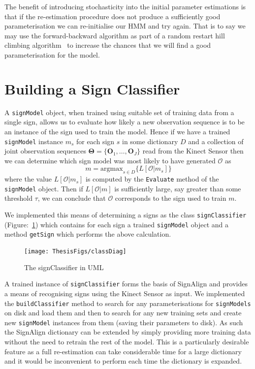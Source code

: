 The benefit of introducing stochasticity into the initial parameter estimations is that if the re-estimation procedure does not produce a sufficiently good parameterisation we can re-initialise our HMM and try again. That is to say we may use the forward-backward algorithm as part of a random restart hill climbing algorithm~\citep{russell1995artificial} to increase the chances that we will find a good parameterisation for the model.

\section{Building a Sign Classifier}
A \verb|signModel| object, when trained using suitable set of training data from a single sign, allows us to evaluate how likely a new observation sequence is to be an instance of the sign used to train the model. Hence if we have a trained \verb|signModel| instance $m_s$ for each sign $s$ in some dictionary $D$ and a collection of joint observation sequences $\bm{\Theta} = \{\mathbf{O}_1, \dots, \mathbf{O}_J\}$ read from the Kinect Sensor then we can determine which sign model was most likely to have generated $\mathcal{O}$ as
\begin{equation*}
m = \text{argmax}_{s \in D}\{ L[\mathcal{O}|m_s]  \}
\end{equation*}
where the value $L[\mathcal{O}|m_s]$ is computed by the \verb|Evaluate| method of the \verb|signModel| object. Then if $L[\mathcal{O}|m]$ is sufficiently large, say greater than some threshold $\tau$, we can conclude that $\mathcal{O}$ corresponds to the sign used to train $m$. 

We implemented this means of determining a signs as the class \verb|signClassifier| (Figure:~\ref{fig:scuml}) which contains for each sign a trained \verb|signModel| object and a method \verb|getSign| which performs the above calculation.
\begin{figure}[t]
        \centering
        \texttt{[image: ThesisFigs/classDiag]}
        \caption{The signClassifier in UML}\label{fig:scuml}
\end{figure}

A trained instance of \verb|signClassifier| forms the basis of SignAlign and provides a means of recognising signs using the Kinect Sensor as input. We implemented the \verb|buildClassifier| method to search for any parameterisations for \verb|signModels| on disk and load them and then to search for any new training sets and create new \verb|signModel| instances from them (saving their parameters to disk). As such the SignAlign dictionary can be extended by simply providing more training data without the need to retrain the rest of the model. This is a particularly desirable feature as a full re-estimation can take considerable time for a large dictionary and it would be inconvenient to perform each time the dictionary is expanded.

